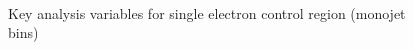 \begin{figure}
\begin{center}
         \\
        \caption{Key analysis variables for single electron control region (monojet bins)}
        \label{fig:distribution_singleele_mono}
    \end{center}
\end{figure}
